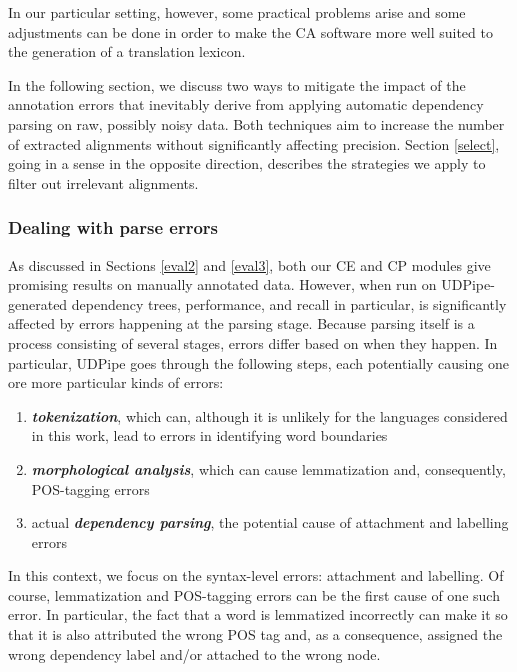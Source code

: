 In our particular setting, however, some practical problems arise and some adjustments can be done in order to make the CA software more well suited to the generation of a translation lexicon. \smallskip

In the following section, we discuss two ways to mitigate the impact of the annotation errors that inevitably derive from applying automatic dependency parsing on raw, possibly noisy data. Both techniques aim to increase the number of extracted alignments without significantly affecting precision.
Section \ref{select}, going in a sense in the opposite direction, describes the strategies we apply to filter out irrelevant alignments.

\subsubsection{Dealing with parse errors}
As discussed in Sections \ref{eval2} and \ref{eval3}, both our CE and CP modules give promising results on manually annotated data. However, when run on UDPipe-generated dependency trees, performance, and recall in particular, is significantly affected by errors happening at the parsing stage. Because parsing itself is a process consisting of several stages, errors differ based on when they happen. In particular, UDPipe goes through the following steps, each potentially causing one ore more particular kinds of errors: \smallskip

\begin{enumerate} 
    \item \textit{\textbf{tokenization}}, which can, although it is unlikely for the languages considered in this work, lead to errors in identifying word boundaries
    \item \textit{\textbf{morphological analysis}}, which can cause lemmatization and, consequently, POS-tagging errors
    \item actual \textit{\textbf{dependency parsing}}, the potential cause of attachment and labelling errors
\end{enumerate} \smallskip

In this context, we focus on the syntax-level errors: attachment and labelling. Of course, lemmatization and POS-tagging errors can be the first cause of one such error. In particular, the fact that a word is lemmatized incorrectly can make it so that it is also attributed the wrong POS tag and, as a consequence, assigned the wrong dependency label and/or attached to the wrong node. \smallskip

